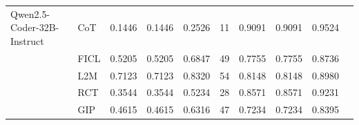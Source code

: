 \documentclass[conference]{IEEEtran}
\begin{document}
\begin{longtable}{p{3.5cm} l r r r r r r r r}
Qwen2.5-Coder-32B-Instruct & CoT  & 0.1446 & 0.1446 & 0.2526 & 11 & 0.9091 & 0.9091 & 0.9524 \\
                           & FICL & 0.5205 & 0.5205 & 0.6847 & 49 & 0.7755 & 0.7755 & 0.8736 \\
                           & L2M  & 0.7123 & 0.7123 & 0.8320 & 54 & 0.8148 & 0.8148 & 0.8980 \\
                           & RCT  & 0.3544 & 0.3544 & 0.5234 & 28 & 0.8571 & 0.8571 & 0.9231 \\
                           & GIP  & 0.4615 & 0.4615 & 0.6316 & 47 & 0.7234 & 0.7234 & 0.8395 \\

\end{longtable}



\setlength{\LTleft}{\fill}
\setlength{\LTright}{\fill}
\end{document}
